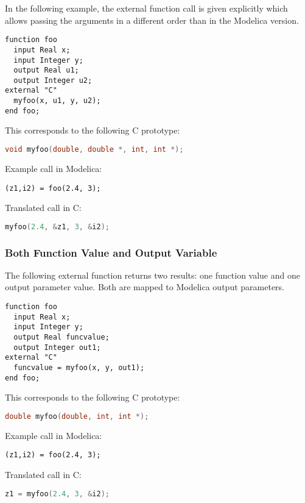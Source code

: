 \begin{example}
In the following example, the external function call is given
explicitly which allows passing the arguments in a different order than
in the Modelica version.
\begin{lstlisting}[language=modelica]
function foo
  input Real x;
  input Integer y;
  output Real u1;
  output Integer u2;
external "C"
  myfoo(x, u1, y, u2);
end foo;
\end{lstlisting}
This corresponds to the following C prototype:
\begin{lstlisting}[language=C]
void myfoo(double, double *, int, int *);
\end{lstlisting}
Example call in Modelica:
\begin{lstlisting}[language=modelica]
(z1,i2) = foo(2.4, 3);
\end{lstlisting}
Translated call in C:
\begin{lstlisting}[language=C]
myfoo(2.4, &z1, 3, &i2);
\end{lstlisting}
\end{example}

\subsubsection{Both Function Value and Output Variable}\label{external-function-with-both-function-value-and-output-variable}\label{both-function-value-and-output-variable}

\begin{example}
The following external function returns two results: one
function value and one output parameter value. Both are mapped to
Modelica output parameters.
\begin{lstlisting}[language=modelica]
function foo
  input Real x;
  input Integer y;
  output Real funcvalue;
  output Integer out1;
external "C"
  funcvalue = myfoo(x, y, out1);
end foo;
\end{lstlisting}
This corresponds to the following C prototype:
\begin{lstlisting}[language=C]
double myfoo(double, int, int *);
\end{lstlisting}
Example call in Modelica:
\begin{lstlisting}[language=modelica]
(z1,i2) = foo(2.4, 3);
\end{lstlisting}
Translated call in C:
\begin{lstlisting}[language=C]
z1 = myfoo(2.4, 3, &i2);
\end{lstlisting}
\end{example}

